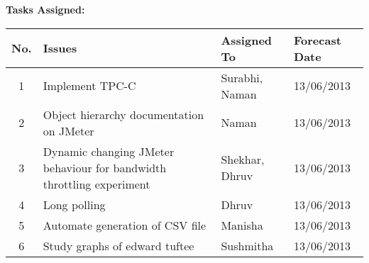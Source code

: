 \documentclass[a4paper,12pt]{article}
\begin{document}
\pagebreak

\vskip20pt

\textbf{Tasks Assigned:}
\vskip10pt
\begin{tabular}{|c|p{6cm}|p{3cm}|p{4cm}|}
 \hline
 \hline
 \textbf{No.} & \textbf{Issues} & \textbf{Assigned To} & \textbf{Forecast Date} \\
  \hline
  \hline
1 & Implement TPC-C & Surabhi, Naman & 13/06/2013 \\
  \hline
2 & Object hierarchy documentation on JMeter & Naman & 13/06/2013 \\
  \hline
3 & Dynamic changing JMeter behaviour for bandwidth throttling experiment & Shekhar, Dhruv & 13/06/2013 \\
  \hline
4 & Long polling & Dhruv & 13/06/2013 \\
  \hline
5 & Automate generation of CSV file & Manisha & 13/06/2013 \\
  \hline
6 & Study graphs of edward tuftee & Sushmitha & 13/06/2013 \\
  \hline
\end{tabular}
\end{document}
